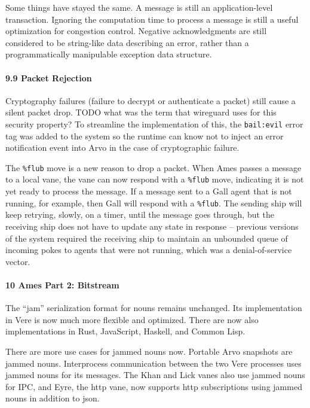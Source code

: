 \documentclass[twoside]{article}
\begin{document}
Some things have stayed the same.  A message is still an application-level transaction.  Ignoring the computation time to process a message is still a useful optimization for congestion control.  Negative acknowledgments are still considered to be string-like data describing an error, rather than a programmatically manipulable exception data structure.

\paragraph{9.9 Packet Rejection}  Cryptography failures (failure to decrypt or authenticate a packet) still cause a silent packet drop.  TODO what was the term that wireguard uses for this security property?  To streamline the implementation of this, the \lstinline[style=inlinecode]{bail:evil} error tag was added to the system so the runtime can know not to inject an error notification event into Arvo in the case of cryptographic failure.

The \lstinline[style=inlinecode]{%flub} move is a new reason to drop a packet.  When Ames passes a message to a local vane, the vane can now respond with a \lstinline[style=inlinecode]{%flub} move, indicating it is not yet ready to process the message.  If a message sent to a Gall agent that is not running, for example, then Gall will respond with a \lstinline[style=inlinecode]{%flub}.  The sending ship will keep retrying, slowly, on a timer, until the message goes through, but the receiving ship does not have to update any state in response – previous versions of the system required the receiving ship to maintain an unbounded queue of incoming pokes to agents that were not running, which was a denial-of-service vector.

\paragraph{10 Ames Part 2:  Bitstream}  The ``jam'' serialization format for nouns remains unchanged.  Its implementation in Vere is now much more flexible and optimized.  There are now also implementations in Rust, JavaScript, Haskell, and Common Lisp.

There are more use cases for jammed nouns now.  Portable Arvo snapshots are jammed nouns.  Interprocess communication between the two Vere processes uses jammed nouns for its messages.  The Khan and Lick vanes also use jammed nouns for IPC, and Eyre, the {\sc http} vane, now supports {\sc http} subscriptions using jammed nouns in addition to {\sc json}.
\end{document}
